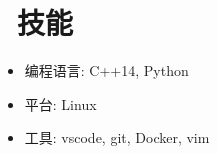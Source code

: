 \section{\faCogs\ 技能}
\begin{itemize}
  \item 编程语言: C++14, Python
  \item 平台: Linux
  \item 工具: vscode, git, Docker, vim
\end{itemize}
